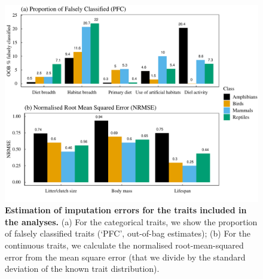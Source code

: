 \documentclass[11pt]{article}
\begin{document}
\begin{figure}[h!]
\centering
\includegraphics[scale=0.7]{Figures/Imputation_errors}
\caption[]{\textbf{Estimation of imputation errors for the traits included in the analyses.} (a) For the categorical traits, we show the proportion of falsely classified traits (`PFC', out-of-bag estimates); (b) For the continuous traits, we calculate the normalised root-mean-squared error from the mean square error (that we divide by the standard deviation of the known trait distribution).}
\label{}
\end{figure}

\end{document}
